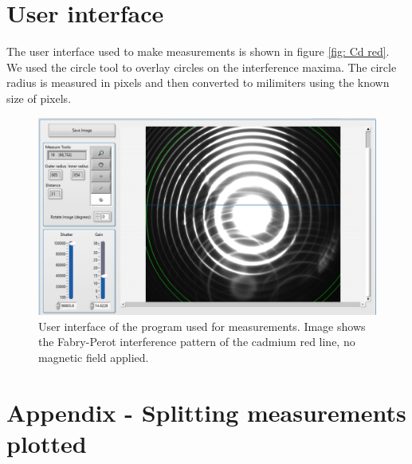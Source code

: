\documentclass[11pt]{article}
\begin{document}
\section{User interface}
The user interface used to make measurements is shown in figure \ref{fig: Cd red}. We used the circle tool to overlay circles on the interference maxima. The circle radius is measured in pixels and then converted to milimiters using the known size of pixels. 

\begin{figure}[h!]
    \centering
    \includegraphics[width=0.65\linewidth]{d measurement.png}
    \captionsetup{justification=centering}
    \caption{User interface of the program used for measurements. Image shows the Fabry-Perot interference pattern of the cadmium red line, no magnetic field applied.}
    \label{fig: d measurement}
\end{figure}

\newpage

\section{Appendix - Splitting measurements plotted}
\end{document}
